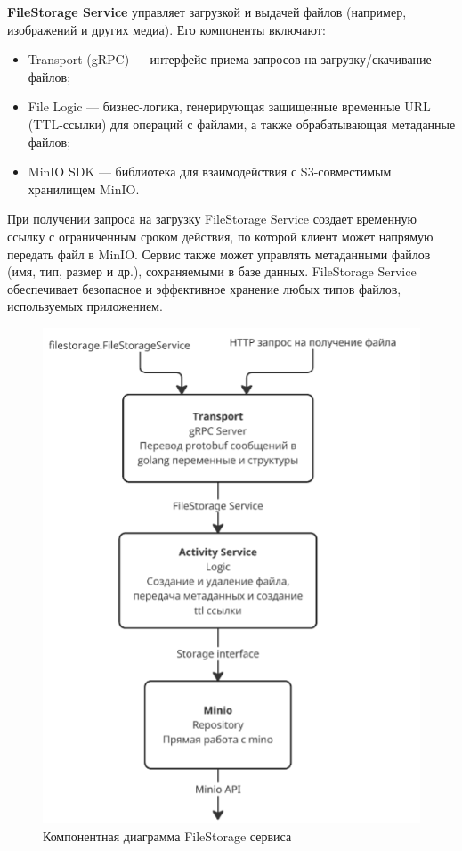 \textbf{FileStorage Service} управляет загрузкой и выдачей файлов (например, изображений и других медиа). Его компоненты включают:
\begin{itemize}
    \item Transport (gRPC) — интерфейс приема запросов на загрузку/скачивание файлов;
    \item File Logic — бизнес-логика, генерирующая защищенные временные URL (TTL-ссылки) для операций с файлами, а также обрабатывающая метаданные файлов;
    \item MinIO SDK — библиотека для взаимодействия с S3-совместимым хранилищем MinIO.
\end{itemize}
При получении запроса на загрузку FileStorage Service создает временную ссылку с ограниченным сроком действия, по которой клиент может напрямую передать файл в MinIO. Сервис также может управлять метаданными файлов (имя, тип, размер и др.), сохраняемыми в базе данных. FileStorage Service обеспечивает безопасное и эффективное хранение любых типов файлов, используемых приложением.
\begin{figure}[H]
        \centering
        \includegraphics[width=0.8\linewidth]{Images/second_chapter_backend_architecture/Picture8.png}
        \caption{Компонентная диаграмма FileStorage сервиса}
        \label{fig:filestorage-service-component-diagram}
\end{figure}

